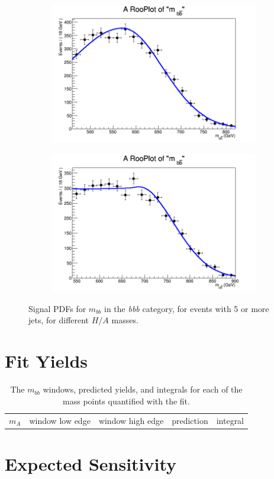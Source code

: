 \begin{figure}[phtb!]
\begin{center}
  \begin{subfigure}[$m_{A}=700$ GeV]{0.4\textwidth}\includegraphics[width=\textwidth]{FitResults/images/fitMC_bAbb700_3.png}\end{subfigure}
  \begin{subfigure}[$m_{A}=800$ GeV]{0.4\textwidth}\includegraphics[width=\textwidth]{FitResults/images/fitMC_bAbb800_3.png}\end{subfigure}
  \caption{Signal PDFs for $m_{bb}$ in the {\it bbb} category, for events with 5 or more jets, for different $H/A$ masses. \label{fig:signalPDFs_5j}}
    \end{center}
\end{figure}



\section{Fit Yields}
\begin{table}
\caption{The $m_{bb}$ windows, predicted yields, and integrals for each of the
    mass points quantified with the fit. \label{tab:bkg_fit_yields}}
    \begin{tabular}{ c c c c c }
        $m_A$ & window low edge & window high edge & prediction & integral \\
    \end{tabular}
\end{table}


\section{Expected Sensitivity}


